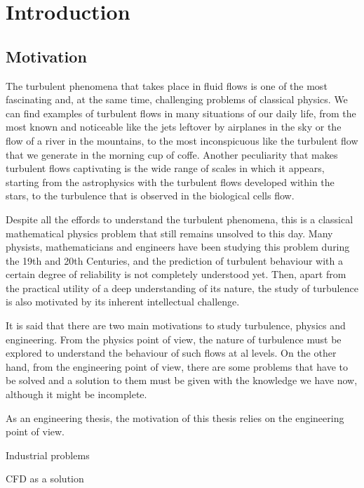 
\chapter{Introduction}
\label{chap-Introduction}

\section{Motivation}

The turbulent phenomena that takes place in fluid flows is one of the most fascinating and, at the same time, challenging problems of classical physics. We can find examples of turbulent flows in many situations of our daily life, from the most known and noticeable like the jets leftover by airplanes in the sky or the flow of a river in the mountains, to the most inconspicuous like the turbulent flow that we generate in the morning cup of coffe. Another peculiarity that makes turbulent flows captivating is the wide range of scales in which it appears, starting from the astrophysics with the turbulent flows developed within the stars, to the turbulence that is observed in the biological cells flow.

Despite all the effords to understand the turbulent phenomena, this is a classical mathematical physics problem that still remains unsolved to this day. Many physists, mathematicians and engineers have been studying this problem during the 19th and 20th Centuries, and the prediction of turbulent behaviour with a certain degree of reliability is not completely understood yet. Then, apart from the practical utility of a deep understanding of its nature, the study of turbulence is also motivated by its inherent intellectual challenge.

It is said that there are two main motivations to study turbulence, physics and engineering. From the physics point of view, the nature of turbulence must be explored to understand the behaviour of such flows at al levels. On the other hand, from the engineering point of view, there are some problems that have to be solved and a solution to them must be given with the knowledge we have now, although it might be incomplete.

As an engineering thesis, the motivation of this thesis relies on the engineering point of view.

Industrial problems

CFD as a solution

